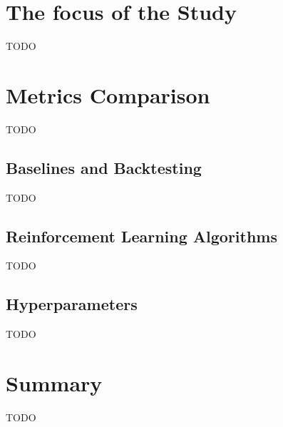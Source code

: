 \documentclass[../xlapes02]{subfiles}
\begin{document}
    \section{The focus of the Study}\label{sec:the-focus-of-the-study}
    TODO


    \section{Metrics Comparison}\label{sec:metrics-comparison}
    TODO

    \subsection{Baselines and Backtesting}\label{subsec:baselines-and-backtesting}
    TODO

    \subsection{Reinforcement Learning Algorithms}\label{subsec:rl-algorithms}
    TODO

    \subsection{Hyperparameters}\label{subsec:hyperparameters}
    TODO


    \section{Summary}\label{sec:summary}
    TODO
\end{document}
